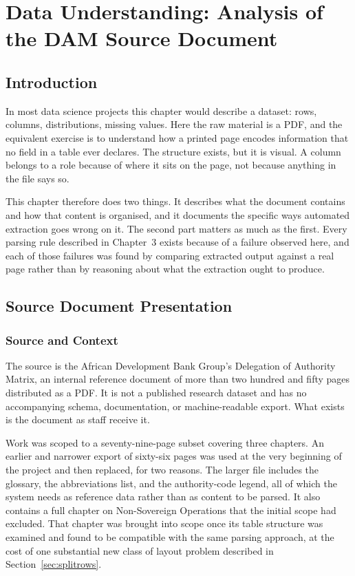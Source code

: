 \chapter{Data Understanding: Analysis of the DAM Source Document}
\minitoc

\section*{Introduction}

In most data science projects this chapter would describe a dataset: rows, columns, distributions, missing values. Here the raw material is a PDF, and the equivalent exercise is to understand how a printed page encodes information that no field in a table ever declares. The structure exists, but it is visual. A column belongs to a role because of where it sits on the page, not because anything in the file says so.

This chapter therefore does two things. It describes what the document contains and how that content is organised, and it documents the specific ways automated extraction goes wrong on it. The second part matters as much as the first. Every parsing rule described in Chapter~3 exists because of a failure observed here, and each of those failures was found by comparing extracted output against a real page rather than by reasoning about what the extraction ought to produce.

\section{Source Document Presentation}

\subsection{Source and Context}

The source is the African Development Bank Group's Delegation of Authority Matrix, an internal reference document of more than two hundred and fifty pages distributed as a PDF. It is not a published research dataset and has no accompanying schema, documentation, or machine-readable export. What exists is the document as staff receive it.

Work was scoped to a seventy-nine-page subset covering three chapters. An earlier and narrower export of sixty-six pages was used at the very beginning of the project and then replaced, for two reasons. The larger file includes the glossary, the abbreviations list, and the authority-code legend, all of which the system needs as reference data rather than as content to be parsed. It also contains a full chapter on Non-Sovereign Operations that the initial scope had excluded. That chapter was brought into scope once its table structure was examined and found to be compatible with the same parsing approach, at the cost of one substantial new class of layout problem described in Section~\ref{sec:splitrows}.

